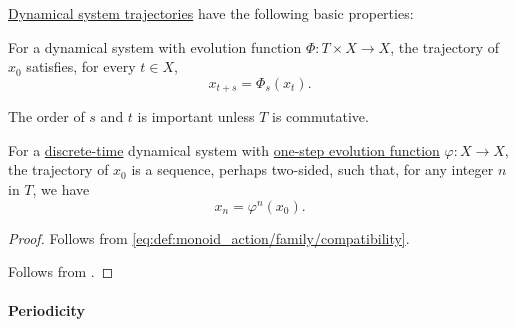 \begin{proposition}\label{thm:def:dynamical_system_trajectory}
  \hyperref[def:dynamical_system_trajectory]{Dynamical system trajectories} have the following basic properties:
  \begin{thmenum}
     For a dynamical system with evolution function \( \Phi: T \times X \to X \), the trajectory of \( x_0 \) satisfies, for every \( t \in X \),
    \begin{equation*}
      x_{t+s} = \Phi_s(x_t).
    \end{equation*}

    The order of \( s \) and \( t \) is important unless \( T \) is commutative.

     For a \hyperref[def:discrete_dynamical_system]{discrete-time} dynamical system with \hyperref[def:one_step_evolution_function]{one-step evolution function} \( \varphi: X \to X \), the trajectory of \( x_0 \) is a sequence, perhaps two-sided, such that, for any integer \( n \) in \( T \), we have
    \begin{equation*}
      x_n = \varphi^n(x_0).
    \end{equation*}
  \end{thmenum}
\end{proposition}
\begin{proof}
   Follows from \ref{eq:def:monoid_action/family/compatibility}.

   Follows from .
\end{proof}

\paragraph{Periodicity}

